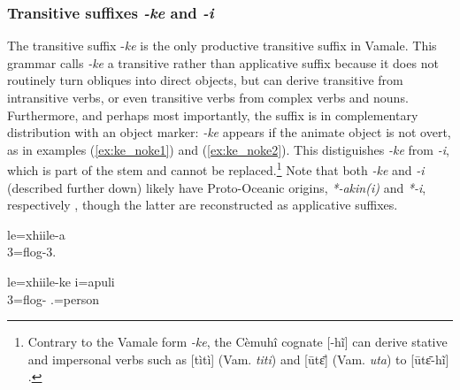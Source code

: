 %
%
%
%
%

\subsubsection{Transitive suffixes \textit{-ke} and \textit{-i}}
\label{ssec:ke_i}
The transitive suffix -\textit{ke} is the only productive transitive suffix in Vamale. This grammar calls \textit{-ke} a transitive rather than applicative suffix because it does not routinely turn obliques into direct objects, but can derive transitive from intransitive verbs, or even transitive verbs from complex verbs and nouns. Furthermore, and perhaps most importantly, the suffix is in complementary distribution with an object marker: \textit{-ke} appears if the animate object is not overt, as in examples (\ref{ex:ke_noke1}) and (\ref{ex:ke_noke2}). This distiguishes \textit{-ke} from \textit{-i}, which is part of the stem and cannot be replaced.\footnote{Contrary to the Vamale form \textit{-ke}, the Cèmuhî cognate {[}-hĩ] can derive stative and impersonal verbs such as {[}tìtì]  (Vam. \textit{titi})  and [ūtɛ̄]  (Vam. \textit{uta}) to {[}ūtɛ̄-hĩ]  \parencite[255]{rivierre_langue_1980}.} Note that both \textit{-ke} and \textit{-i} (described further down) likely have Proto-Oceanic origins, \textit{*-akin(i)} and \textit{*-i}, respectively \parencite[507]{ross_morphosyntactic_2004}, though the latter are reconstructed as applicative suffixes. 



	\ea\label{ex:ke_noke1}	
	\gll le=xhiile-a\\
	 3=flog-3.\\
	\glt {}
	\z
	
	
	\ea\label{ex:ke_noke2}
	\gll le=xhiile-ke i=apuli\\
	 3=flog- .=person\\
	\glt {}
		\z


